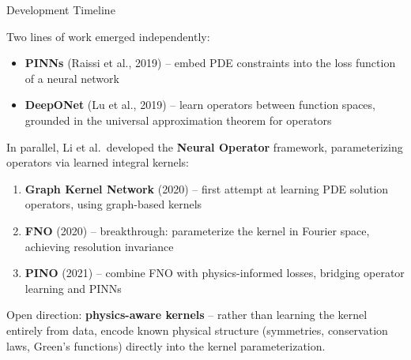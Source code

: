 \documentclass[aspectratio=169]{beamer}
\begin{document}
\begin{frame}{Development Timeline}

  \footnotesize
  Two lines of work emerged independently:

  \begin{itemize}\setlength\itemsep{0.1em}
    \item \textbf{PINNs} (Raissi et al., 2019) -- embed PDE constraints into
      the loss function of a neural network
    \item \textbf{DeepONet} (Lu et al., 2019) -- learn operators between
      function spaces, grounded in the universal approximation theorem for
      operators
  \end{itemize}

  \vspace{0.2em}
  In parallel, Li et al.\ developed the \textbf{Neural Operator} framework,
  parameterizing operators via learned integral kernels:

  \begin{enumerate}\setlength\itemsep{0.1em}
    \item \textbf{Graph Kernel Network} (2020) -- first attempt at learning PDE
      solution operators, using graph-based kernels
    \item \textbf{FNO} (2020) -- breakthrough: parameterize the kernel in
      Fourier space, achieving resolution invariance
    \item \textbf{PINO} (2021) -- combine FNO with physics-informed losses,
      bridging operator learning and PINNs
  \end{enumerate}

  \vspace{0.2em}
  Open direction: \textbf{physics-aware kernels} -- rather than learning the
  kernel entirely from data, encode known physical structure (symmetries,
  conservation laws, Green's functions) directly into the kernel
  parameterization.

\end{frame}
\end{document}
